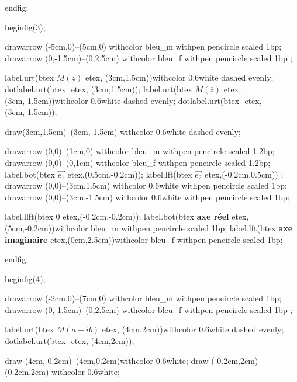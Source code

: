 \documentclass[12pt]{article}
\begin{document}
endfig;


beginfig(3);

drawarrow (-5cm,0)--(5cm,0) withcolor bleu_m withpen pencircle scaled 1bp;
drawarrow (0,-1.5cm)--(0,2.5cm)  withcolor bleu_f withpen pencircle scaled 1bp ;

label.urt(btex $M(z)$ etex, (3cm,1.5cm))withcolor 0.6white dashed evenly;
dotlabel.urt(btex $ $ etex, (3cm,1.5cm));
label.urt(btex $M( \displaystyle \overline{z})$ etex, (3cm,-1.5cm))withcolor 0.6white dashed evenly;
dotlabel.urt(btex $ $ etex, (3cm,-1.5cm));

draw(3cm,1.5cm)--(3cm,-1.5cm) withcolor 0.6white dashed evenly;



drawarrow (0,0)--(1cm,0) withcolor bleu_m withpen pencircle scaled 1.2bp;
drawarrow (0,0)--(0,1cm) withcolor bleu_f withpen pencircle scaled 1.2bp;
label.bot(btex $\overrightarrow{e_1}$ etex,(0.5cm,-0.2cm));
label.lft(btex $\overrightarrow{e_2}$ etex,(-0.2cm,0.5cm)) ;
drawarrow (0,0)--(3cm,1.5cm) withcolor 0.6white withpen pencircle scaled 1bp;
drawarrow (0,0)--(3cm,-1.5cm) withcolor 0.6white withpen pencircle scaled 1bp;

label.llft(btex $0$ etex,(-0.2cm,-0.2cm));
label.bot(btex \textbf{axe r\'eel} etex,(5cm,-0.2cm))withcolor bleu_m withpen pencircle scaled 1bp;
label.lft(btex \textbf{axe imaginaire} etex,(0cm,2.5cm))withcolor bleu_f withpen pencircle scaled 1bp;

endfig;

beginfig(4);

drawarrow (-2cm,0)--(7cm,0) withcolor bleu_m withpen pencircle scaled 1bp;
drawarrow (0,-1.5cm)--(0,2.5cm)  withcolor bleu_f withpen pencircle scaled 1bp ;

label.urt(btex $M(a+ib)$ etex, (4cm,2cm))withcolor 0.6white dashed evenly;
dotlabel.urt(btex $ $ etex, (4cm,2cm));


draw (4cm,-0.2cm)--(4cm,0.2cm)withcolor 0.6white;
draw (-0.2cm,2cm)--(0.2cm,2cm) withcolor 0.6white;
\end{document}
